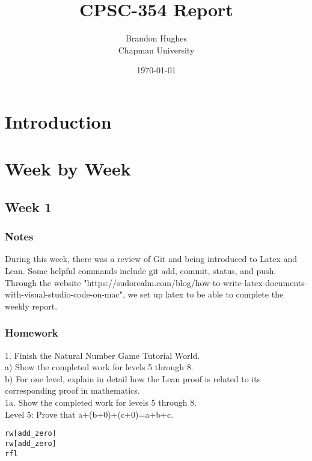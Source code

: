 \documentclass{article}
\title{CPSC-354 Report}
\author{Brandon Hughes \\ Chapman University}
\date{\today}
\theoremstyle{theorem}
\theoremstyle{definition}
\theoremstyle{remark}
\begin{document}
\maketitle

\begin{abstract}
\end{abstract}

\setcounter{tocdepth}{3}
\tableofcontents

\section{Introduction}\label{intro}

\section{Week by Week}\label{homework}

\subsection{Week 1}

\subsubsection{Notes}

During this week, there was a review of Git and being introduced to Latex and Lean. Some helpful commands include git add, commit, status, and push. 
Through the website "https://sudorealm.com/blog/how-to-write-latex-documents-with-visual-studio-code-on-mac", we set up latex to be able to complete the weekly report.

\subsubsection{Homework} 

1. Finish the Natural Number Game Tutorial World. \\
\hspace*{2em}a) Show the completed work for levels 5 through 8. \\
\hspace*{2em}b) For one level, explain in detail how the Lean proof is related to its corresponding proof in mathematics. \\

1a. Show the completed work for levels 5 through 8. \\
Level 5: Prove that a+(b+0)+(c+0)=a+b+c.
\begin{lstlisting}
rw[add_zero]
rw[add_zero]
rfl
\end{lstlisting}
\end{document}
